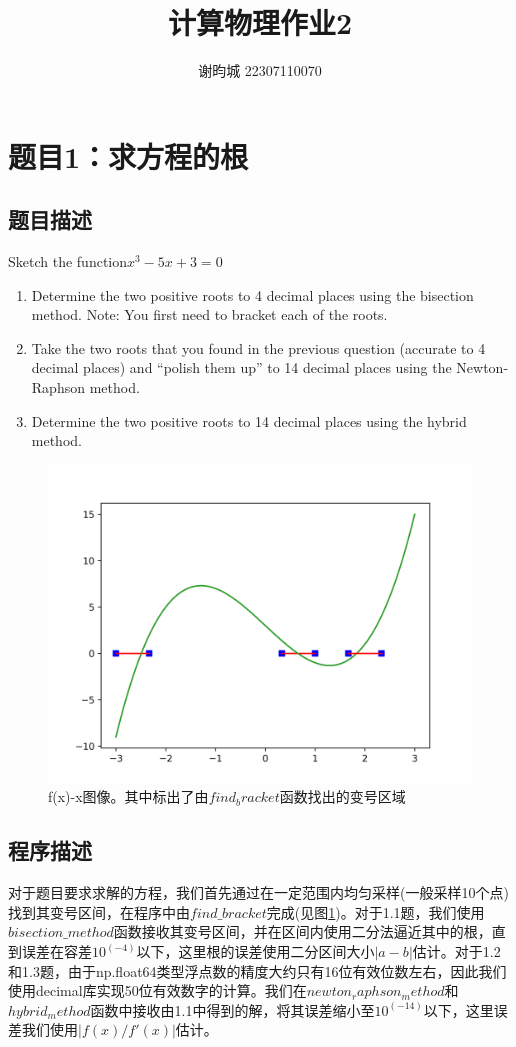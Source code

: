 \documentclass[11pt]{article}
\author{谢昀城 22307110070}
\title{计算物理作业2}
\begin{document}
\maketitle


\section{题目1：求方程的根}
\subsection{题目描述}
Sketch the function$x^3-5x+3=0$
\begin{enumerate}
    \item Determine the two positive roots to 4 decimal places using the bisection method. Note: You first need to bracket each of the roots.
    \item Take the two roots that you found in the previous question (accurate to 4 decimal places) and “polish them up” to 14 decimal places using the Newton-Raphson method.
    \item Determine the two positive roots to 14 decimal places using the hybrid method.
\end{enumerate}
\begin{figure}[htpb]
    \centering
    \includegraphics[width=1\linewidth]{photo/f(x) with bracket.png}
    \caption{f(x)-x图像。其中标出了由$find_bracket$函数找出的变号区域}
    \label{fig:1}
\end{figure}

\subsection{程序描述}
对于题目要求求解的方程，我们首先通过在一定范围内均匀采样(一般采样10个点)找到其变号区间，在程序中由$find\_bracket$完成(见图\ref{fig:1})。对于1.1题，我们使用$bisection\_method$函数接收其变号区间，并在区间内使用二分法逼近其中的根，直到误差在容差$10^(-4)$以下，这里根的误差使用二分区间大小$|a-b|$估计。对于1.2和1.3题，由于np.float64类型浮点数的精度大约只有16位有效位数左右，因此我们使用decimal库实现50位有效数字的计算。我们在$newton_raphson_method$和$hybrid_method$函数中接收由1.1中得到的解，将其误差缩小至$10^(-14)$以下，这里误差我们使用$|f(x)/f'(x)|$估计。
\end{document}
